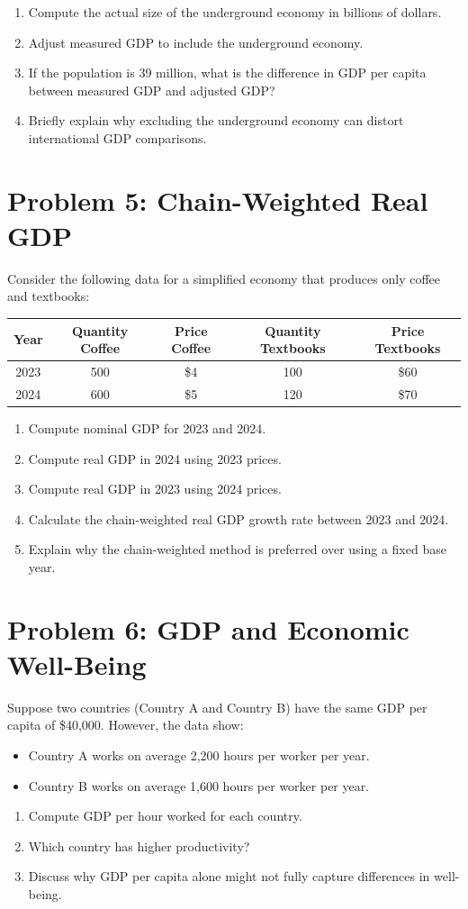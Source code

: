 \documentclass[11pt]{article}
\begin{document}
\begin{enumerate}[label=\alph*)]
    \item Compute the actual size of the underground economy in billions of dollars.  
    \item Adjust measured GDP to include the underground economy.  
    \item If the population is 39 million, what is the difference in GDP per capita between measured GDP and adjusted GDP?  
    \item Briefly explain why excluding the underground economy can distort international GDP comparisons.  
\end{enumerate}

\bigskip

\section*{Problem 5: Chain-Weighted Real GDP}
Consider the following data for a simplified economy that produces only coffee and textbooks:  

\begin{center}
\begin{tabular}{c c c c c}
\toprule
Year & Quantity Coffee & Price Coffee & Quantity Textbooks & Price Textbooks \\
\midrule
2023 & 500 & \$4 & 100 & \$60 \\
2024 & 600 & \$5 & 120 & \$70 \\
\bottomrule
\end{tabular}
\end{center}

\begin{enumerate}[label=\alph*)]
    \item Compute nominal GDP for 2023 and 2024.  
    \item Compute real GDP in 2024 using 2023 prices.  
    \item Compute real GDP in 2023 using 2024 prices.  
    \item Calculate the chain-weighted real GDP growth rate between 2023 and 2024.  
    \item Explain why the chain-weighted method is preferred over using a fixed base year.  
\end{enumerate}

\bigskip

\section*{Problem 6: GDP and Economic Well-Being}
Suppose two countries (Country A and Country B) have the same GDP per capita of \$40,000. However, the data show:  
\begin{itemize}
    \item Country A works on average 2,200 hours per worker per year.  
    \item Country B works on average 1,600 hours per worker per year.  
\end{itemize}

\begin{enumerate}[label=\alph*)]
    \item Compute GDP per hour worked for each country.  
    \item Which country has higher productivity?  
    \item Discuss why GDP per capita alone might not fully capture differences in well-being.  
\end{enumerate}
\end{document}
